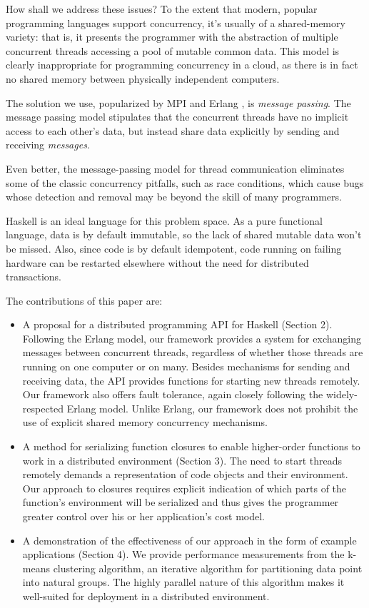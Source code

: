 \documentclass[preprint]{sigplanconf}
\begin{document}
How shall we address these issues? To the extent that modern, popular programming languages support concurrency, it's usually of a shared-memory variety: that is, it presents the programmer with the abstraction of multiple concurrent threads accessing a pool of mutable common data. This model is clearly inappropriate for programming concurrency in a cloud, as there is in fact no shared memory between physically independent computers.

The solution we use, popularized by MPI \cite{mpi99} and Erlang \cite{Erlang93}, is {\em message passing}. The message passing model stipulates that the concurrent threads have no implicit access to each other's data, but instead share data explicitly by sending and receiving {\em messages}. 

Even better, the message-passing model for thread communication eliminates some of the classic concurrency pitfalls, such as race conditions, which cause bugs whose detection and removal may be beyond the skill of many programmers. 

Haskell is an ideal language for this problem space. As a pure functional language, data is by default immutable, so the lack of shared mutable data won't be missed. Also, since code is by default idempotent, code running on failing hardware can be restarted elsewhere without the need for distributed transactions.

The contributions of this paper are:

\begin{itemize}
\item A proposal for a distributed programming API for Haskell (Section 2). Following the Erlang model, our framework provides a system for exchanging messages between concurrent threads, regardless of whether those threads are running on one computer or on many. Besides mechanisms for sending and receiving data, the API provides functions for starting new threads remotely. Our framework also offers fault tolerance, again closely following the widely-respected Erlang model. Unlike Erlang, our framework does not prohibit the use of explicit shared memory concurrency mechanisms.
\item A method for serializing function closures to enable higher-order functions to work in a distributed environment (Section 3). The need to start threads remotely demands a representation of code objects and their environment. Our approach to closures requires explicit indication of which parts of the function's environment will be serialized and thus gives the programmer greater control over his or her application's cost model.
\item A demonstration of the effectiveness of our approach in the form of example applications (Section 4). We provide performance measurements from the k-means clustering algorithm, an iterative algorithm for partitioning data point into natural groups. The highly parallel nature of this algorithm makes it well-suited for deployment in a distributed environment.
\end{itemize}
\end{document}
